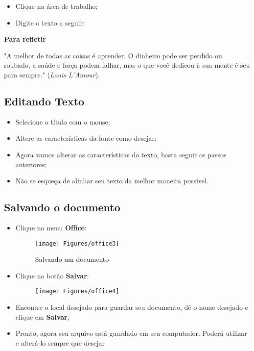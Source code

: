 \documentclass[hidelinks,12pt]{article}
\begin{document}
		\begin{itemize}
			\item Clique na área de trabalho;

			\item Digite o texto a seguir:
		\end{itemize}


		{\textbf{\hspace{5cm} Para refletir}}

		"A melhor de todas as coisas é aprender. O dinheiro pode ser perdido ou roubado, a saúde e força podem falhar, mas o que você dedicou à sua mente é seu para sempre." (\emph{Louis L'Amour}).



	\subsection{Editando Texto}

		\begin{itemize}
			\item Selecione o título com o mouse;

			\item Altere as características da fonte como desejar;

			\item Agora vamos alterar as características do texto, basta seguir os passos anteriores;

			\item Não se esqueça de alinhar seu texto da melhor maneira possível.
		\end{itemize}


	\subsection{Salvando o documento}

	\begin{itemize}
		\item Clique no menu \textbf{Office}:

		\begin{figure}[!h]
			\centering
			\texttt{[image: Figures/office3]}
			\label{fig:office3}
			\caption{Salvando um documento}
		\end{figure}

		\item Clique no botão \textbf{Salvar}:

		\begin{figure}[!h]
			\centering
			\texttt{[image: Figures/office4]}
			\label{fig:office4}
		\end{figure}


		\item Encontre o local desejado para guardar seu documento, dê o nome desejado e clique em \textbf{Salvar};

		\item Pronto, agora seu arquivo está guardado em seu computador. Poderá utilizar e alterá-lo sempre que desejar

	\end{itemize}
\end{document}
